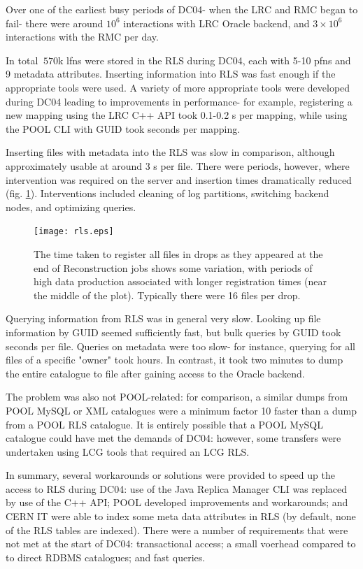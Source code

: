 \documentclass{cmspaper}
\begin{document}
Over one of the earliest busy periods of DC04- when the LRC and RMC began to fail- there were around $10^6$ interactions with LRC Oracle backend, and $3\times10^6$ interactions with the RMC per day. 

In total $~570$k lfns were stored in the RLS during DC04, each with 5-10 pfns and 9 metadata attributes. Inserting information into RLS was fast enough if  the appropriate tools were used. A variety of more appropriate tools were developed during DC04 leading to improvements in performance- for example, registering a new mapping using the LRC C++ API took 0.1-0.2 s per mapping, while using the POOL CLI with GUID took seconds per mapping.

Inserting files with metadata into the RLS was slow in comparison, although approximately usable at around 3 s per file. There were periods, however, where intervention was required on the server and insertion times dramatically reduced (fig. \ref{fig:rls}). Interventions included cleaning of log partitions, switching backend nodes, and optimizing queries.

\begin{figure}[tbp]
\centering
\texttt{[image: rls.eps]}
\label{fig:rls}
\caption{The time taken to register all files in drops as they appeared at the end of Reconstruction jobs shows some variation, with periods of high data production associated with longer registration times (near the middle of the plot). Typically there were 16 files per drop.}
\end{figure} 

Querying information from RLS was in general very slow. Looking up file information by GUID seemed sufficiently fast, but bulk queries by GUID took seconds per file. Queries on metadata were too slow- for instance, querying for all files of a specific "owner" took hours. In contrast, it took two minutes to dump the entire catalogue to file after gaining access to the Oracle backend.

The problem was also not POOL-related: for comparison, a similar dumps from POOL MySQL or XML catalogues were a minimum factor 10 faster than a dump from a POOL RLS catalogue. It is entirely possible that a POOL MySQL catalogue could have met the demands of DC04: however, some transfers were undertaken using LCG tools that required an LCG RLS.

In summary, several workarounds or solutions were provided to speed up the access to RLS during DC04: use of the Java Replica Manager CLI was replaced by use of the C++ API; POOL developed improvements and workarounds; and CERN IT were able to index some meta data attributes in RLS (by default, none of the RLS tables are indexed). There were a number of requirements that were not met at the start of DC04: transactional access; a small voerhead compared to to direct RDBMS catalogues; and fast queries.
\end{document}
